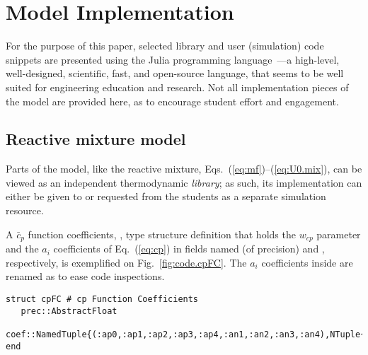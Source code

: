 
\section{Model Implementation}

    For the  purpose  of  this  paper,  selected  library  and  user  (simulation)  code  snippets  are  presented  using  the  Julia  programming  language~\cite{2012-BezansonJ+EdelmanA-CoRR,
    2017-BezansonJ+ShahVB-SIAMRev}---a high-level, well-designed, scientific, fast, and open-source language, that seems to be well suited for  engineering  education  and  research.  Not  all
    implementation pieces of the model are provided here, as to encourage student effort and engagement.

    \subsection{Reactive mixture model}

    Parts of the model, like the reactive mixture, Eqs.~(\ref{eq:mf})--(\ref{eq:U0.mix}), can be viewed as an independent thermodynamic \emph{library}; as such, its implementation  can  either
    be given to or requested from the students as a separate simulation resource.

    A $\bar{c}_p$ function coefficients, , type structure definition that holds the $w_{cp}$ parameter and the $a_i$ coefficients of Eq.~(\ref{eq:cp}) in  fields  named  
    (of precision) and , respectively, is exemplified on Fig.~\ref{fig:code.cpFC}. The $a_i$ coefficients inside  are renamed as to ease code inspections.

    \begin{figure*}[h]
        \centering
        \begin{lstlisting}
struct cpFC # cp Function Coefficients
   prec::AbstractFloat
   coef::NamedTuple{(:ap0,:ap1,:ap2,:ap3,:ap4,:an1,:an2,:an3,:an4),NTuple{9,AbstractFloat}}
end
        \end{lstlisting}
        \caption{Listing for the  structure definition code snippet, for storing $\bar{c}_p\,:\,\bar{c}_p(T)$ model coefficients. Data members include the precision   and
            the  coefficients as a }
        \label{fig:code.cpFC}
    \end{figure*}

